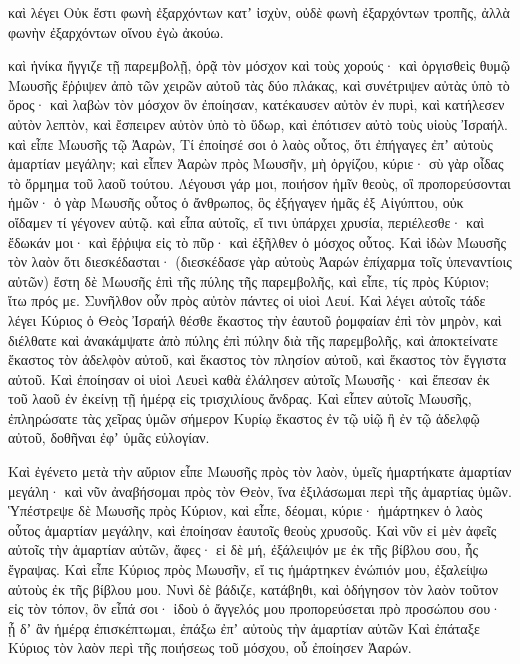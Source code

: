 {καὶ λέγει Οὐκ ἔστι φωνὴ ἐξαρχόντων κατʼ ἰσχὺν, οὐδὲ φωνὴ ἐξαρχόντων τροπῆς, ἀλλὰ φωνὴν ἐξαρχόντων οἴνου ἐγὼ ἀκούω.
\par }{\PP {}καὶ ἡνίκα ἤγγιζε τῇ παρεμβολῇ, ὁρᾷ τὸν μόσχον καὶ τοὺς χορούς· καὶ ὀργισθεὶς θυμῷ Μωυσῆς ἔῤῥιψεν ἀπὸ τῶν χειρῶν αὐτοῦ τὰς δύο πλάκας, καὶ συνέτριψεν αὐτὰς ὑπὸ τὸ ὄρος·
καὶ λαβὼν τὸν μόσχον ὃν ἐποίησαν, κατέκαυσεν αὐτὸν ἐν πυρὶ, καὶ κατήλεσεν αὐτὸν λεπτὸν, καὶ ἔσπειρεν αὐτὸν ὑπὸ τὸ ὕδωρ, καὶ ἐπότισεν αὐτὸ τοὺς υἱοὺς Ἰσραήλ.
καὶ εἶπε Μωυσῆς τῷ Ἀαρὼν, Τί ἐποίησέ σοι ὁ λαὸς οὗτος, ὅτι ἐπήγαγες ἐπʼ αὐτοὺς ἁμαρτίαν μεγάλην;
καὶ εἶπεν Ἀαρὼν πρὸς Μωυσῆν, μὴ ὀργίζου, κύριε· σὺ γὰρ οἶδας τὸ ὅρμημα τοῦ λαοῦ τούτου.
Λέγουσι γάρ μοι, ποιήσον ἡμῖν θεοὺς, οἳ προπορεύσονται ἡμῶν· ὁ γὰρ Μωυσῆς οὗτος ὁ ἄνθρωπος, ὃς ἐξήγαγεν ἡμᾶς ἐξ Αἰγύπτου, οὐκ οἴδαμεν τί γέγονεν αὐτῷ.
καὶ εἶπα αὐτοῖς, εἴ τινι ὑπάρχει χρυσία, περιέλεσθε· καὶ ἔδωκάν μοι· καὶ ἔῤῥιψα εἰς τὸ πῦρ· καὶ ἐξῆλθεν ὁ μόσχος οὗτος.
Καὶ ἰδὼν Μωυσῆς τὸν λαὸν ὅτι διεσκέδασται· (διεσκέδασε γὰρ αὐτοὺς Ἀαρών ἐπίχαρμα τοῖς ὑπεναντίοις αὐτῶν)
ἔστη δὲ Μωυσῆς ἑπὶ τῆς πύλης τῆς παρεμβολῆς, καὶ εἶπε, τίς πρὸς Κύριον; ἴτω πρός με. Συνῆλθον οὖν πρὸς αὐτὸν πάντες οἱ υἱοὶ Λευί.
Καὶ λέγει αὐτοῖς τάδε λέγει Κύριος ὁ Θεὸς Ἰσραήλ θέσθε ἕκαστος τὴν ἑαυτοῦ ῥομφαίαν ἐπὶ τὸν μηρὸν, καὶ διέλθατε καὶ ἀνακάμψατε ἀπὸ πύλης ἐπὶ πύλην διὰ τῆς παρεμβολῆς, καὶ ἀποκτείνατε ἕκαστος τὸν ἀδελφὸν αὐτοῦ, καὶ ἕκαστος τὸν πλησίον αὐτοῦ, καὶ ἕκαστος τὸν ἔγγιστα αὐτοῦ.
Καὶ ἐποίησαν οἱ υἱοὶ Λευεὶ καθὰ ἐλάλησεν αὐτοῖς Μωυσῆς· καὶ ἔπεσαν ἐκ τοῦ λαοῦ ἐν ἐκείνῃ τῇ ἡμέρᾳ εἰς τρισχιλίους ἄνδρας.
Καὶ εἶπεν αὐτοῖς Μωυσῆς, ἐπληρώσατε τὰς χεῖρας ὑμῶν σήμερον Κυρίῳ ἕκαστος ἐν τῷ υἱῷ ἢ ἐν τῷ ἀδελφῷ αὐτοῦ, δοθῆναι ἐφʼ ὑμᾶς εὐλογίαν.
\par }{\PP {}Καὶ ἐγένετο μετὰ τὴν αὔριον εἶπε Μωυσῆς πρὸς τὸν λαὸν, ὑμεῖς ἡμαρτήκατε ἁμαρτίαν μεγάλη· καὶ νῦν ἀναβήσομαι πρὸς τὸν Θεὸν, ἵνα ἐξιλάσωμαι περὶ τῆς ἁμαρτίας ὑμῶν.
Ὑπέστρεψε δὲ Μωυσῆς πρὸς Κύριον, καὶ εἶπε, δέομαι, κύριε· ἡμάρτηκεν ὁ λαὸς οὗτος ἁμαρτίαν μεγάλην, καὶ ἐποίησαν ἑαυτοῖς θεοὺς χρυσοῦς.
Καὶ νῦν εἰ μὲν ἀφεῖς αὐτοῖς τὴν ἁμαρτίαν αὐτῶν, ἄφες· εἰ δὲ μή, ἐξάλειψόν με ἐκ τῆς βίβλου σου, ἧς ἔγραψας.
Καὶ εἶπε Κύριος πρὸς Μωυσῆν, εἴ τις ἡμάρτηκεν ἐνώπιόν μου, ἐξαλείψω αὐτοὺς ἐκ τῆς βίβλου μου.
Νυνὶ δὲ βάδιζε, κατάβηθι, καὶ ὁδήγησον τὸν λαὸν τοῦτον εἰς τὸν τόπον, ὃν εἶπά σοι· ἰδοὺ ὁ ἄγγελός μου προπορεύσεται πρὸ προσώπου σου· ᾖ δʼ ἂν ἡμέρᾳ ἐπισκέπτωμαι, ἐπάξω ἐπʼ αὐτοὺς τὴν ἁμαρτίαν αὐτῶν
Καὶ ἐπάταξε Κύριος τὸν λαὸν περὶ τῆς ποιήσεως τοῦ μόσχου, οὗ ἐποίησεν Ἀαρών.

}
